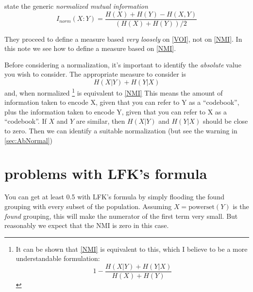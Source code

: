 \documentclass[9pt,technote]{IEEEtran}
\begin{document}
 \citet{lancichinetti-2009} state the generic \emph{normalized mutual information}
 \begin{equation}
	 I_{norm}(X:Y) = \frac { H(X) + H(Y) - H(X,Y) } { \left( H(X) + H(Y) \right ) /2 }   \label{NMI}
 \end{equation}

They proceed to define a measure based \emph{very loosely} on \cref{VOI}, not on \cref{NMI}. In this note we see how to define a measure
based on \cref{NMI}.

Before considering a normalization, it's important to identify the \emph{absolute} value you wish to consider.
The appropriate measure to consider is
\begin{equation}
	H(X|Y) + H(Y|X)   \label{CorrectMI}
\end{equation}
and, when normalized \footnote{
	It can be shown that \cref{NMI} is equivalent to this, which I believe to be a more understandable formulation:
 \[
	1 - \frac { H(X|Y) + H(Y|X)  }{ H(X) + H(Y) } 
	\]
} is equivalent to \cref{NMI}
This means the amount of information taken to encode X, given that you can refer to Y as a ``codebook'', plus
the information taken to encode Y, given that you can refer to X as a ``codebook''. If $X$ and $Y$ are similar, then
$H(X|Y)$ and $H(Y|X)$ should be close to zero. Then we can identify a suitable normalization (but see the warning in \cref{sec:AbNormal})

\begin{comment}
\section{WARNING}
I'm pretty sloppy, as ever, with my terminology. I just take $H(x)$ to mean the number of bits taken to encode $x$. Hence
I tend to think in $\log_2$, the log to the base 2, when technically I suppose it should be $\log_e$. There's lots of other careless things too, no doubt \begin{turn}{90}(-:\end{turn}.
\end{comment}

\section{problems with LFK's formula}
\label{sec:Flood}

You can get at least 0.5 with LFK's formula by simply flooding the found grouping with every subset of the population.
Assuming $X = \mbox{powerset}(Y)$ is the \emph{found} grouping, this will make the numerator of the first term
very small. But reasonably we expect that the NMI is zero in this case.
\end{document}
